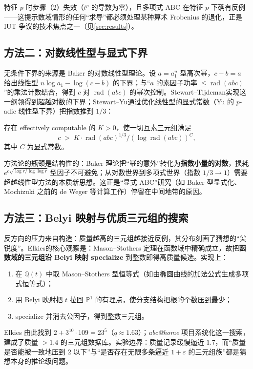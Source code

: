特征 $p$ 时步骤（2）失效（$t^p$ 的导数为零），且多项式 ABC 在特征 $p$ 下确有反例——这提示数域情形的任何“求导”都必须处理某种算术 Frobenius 的退化，正是 IUT 争议的技术焦点之一（见\cref{sec:results}）。

\subsection{方法二：对数线性型与显式下界}

无条件下界的来源是 Baker 的对数线性型理论。设 $a = a_1^n$ 型高次幂，$c - b = a$ 给出线性型 $n \log a_1 - \log(c-b)$ 的下界；与“$a$ 的素因子功率 $\leq \operatorname{rad}(abc)$”的乘法计数结合，得到 $c$ 对 $\operatorname{rad}(abc)$ 的幂次控制。Stewart--Tijdeman\cite{stewarttijdeman1986}实现这一纲领得到超越对数的下界；Stewart--Yu\cite{stewartyu2001}通过优化线性型的显式常数（Yu 的 $p$-adic 线性型下界）把指数推到 $1/3$：

\begin{theorem}\label{thm:stewartyu}
    存在 effectively computable 的 $K > 0$，使一切互素三元组满足
    \begin{equation}
        c \;>\; K \cdot \operatorname{rad}(abc)^{1/3} \big/ (\log \operatorname{rad}(abc))^{C},
    \end{equation}
    其中 $C$ 为显式常数。
\end{theorem}

方法论的瓶颈是结构性的：Baker 理论把“幂的意外”转化为\textbf{指数小量的对数}，损耗 $e^{c\sqrt{\log r/\log\log r}}$ 型因子不可避免；从对数世界到多项式世界（指数 $1/3 \to 1$）需要超越线性型方法的本质新思想。这正是“显式 ABC”研究（如 Baker 型显式化、Mochizuki 之前的 de Weger 等计算工作）停留在中间地带的原因。

\subsection{方法三：Belyi 映射与优质三元组的搜索}

反方向的压力来自构造：质量越高的三元组越接近反例，其分布刻画了猜想的“尖锐度”。Elkies\cite{elkies1991}的核心观察是：Mason--Stothers 定理在函数域中精确成立，故把\textbf{函数域的三元组沿 Belyi 映射 specialize} 到整数即得高质量候选。实现上：
\begin{enumerate}[label=(\arabic*)]
    \item 在 $\mathbb{Q}(t)$ 中取 Mason--Stothers 型恒等式（如由椭圆曲线的加法公式生成多项式恒等式）；
    \item 用 Belyi 映射把 $t$ 拉回 $\mathbb{P}^1$ 的有理点，使分支结构把根的个数压到最少；
    \item specialize 并消去公因子，得到整数三元组。
\end{enumerate}
Elkies 由此找到 $2 + 3^{10} \cdot 109 = 23^5$（$q \approx 1.63$）；\textit{abc@home} 项目系统化这一搜索，建成了质量 $> 1.4$ 的三元组数据库。实验边界：质量记录缓慢逼近 $1.7$，而“质量是否能被一致地压到 $2$ 以下”与“是否存在无限多条逼近 $1+\varepsilon$ 的三元组族”都是猜想本身的推论级问题。

